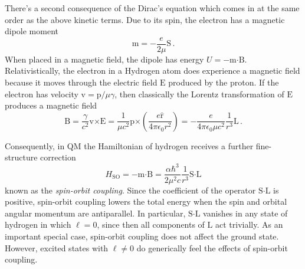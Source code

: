\documentclass{article}
\theoremstyle{plain}\theoremheaderfont{\normalfont\itshape}\theorembodyfont{\rmfamily}\theoremseparator{.}\newtheorem*{rem}{Remark}\newtheorem*{ex}{Example}\newtheorem*{proof}{Proof}\newtheorem*{altp}{Alternative proof}
\theoremstyle{plain}\theoremheaderfont{\normalfont\bfseries}\theorembodyfont{\rmfamily}\theoremseparator{.}\newtheorem{thm}{Theorem}[section]\newtheorem{lem}[thm]{Lemma}\newtheorem{prop}[thm]{Proposition}\newtheorem*{cor}{Corollary}\newtheorem{defn}[thm]{Definition}\newtheorem{clm}[thm]{Claim}\newtheorem{clminproof}{Claim}
\theoremstyle{break}\theoremheaderfont{\normalfont\itshape}\theorembodyfont{\rmfamily}\theoremseparator{.\medskip}\newtheorem*{proofskip}{Proof}\newtheorem*{exs}{Examples}\newtheorem*{rems}{Remarks}
\theoremstyle{break}\theoremheaderfont{\normalfont\bfseries}\theorembodyfont{\rmfamily}\theoremseparator{.\medskip}\newtheorem{lemskip}[thm]{Lemma}\newtheorem{defnskip}[thm]{Definition}\newtheorem{propskip}[thm]{Proposition}\newtheorem{thmskip}[thm]{Theorem}
\numberwithin{equation}{section}
\newcommand{\vb}[1]{\bm{\mathrm{#1}}}
\newcommand{\vu}[1]{\hat{\bm{\mathrm{#1}}}}
\newcommand{\cross}{\bm{\times}}
\newcommand{\vdot}{\bm{\cdot}}
\begin{document}
    There's a second consequence of the Dirac's equation which comes in at the same order as the above kinetic terms. Due to its spin, the electron has a magnetic dipole moment
    \begin{equation}
        \vb{m}=-\frac{e}{2\mu}\vb{S}\,.
    \end{equation}
    When placed in a magnetic field, the dipole has energy \(U=-\vb{m}\vdot\vb{B}\). Relativistically, the electron in a Hydrogen atom does experience a magnetic field because it moves through the electric field \(\vb{E}\) produced by the proton. If the electron has velocity \(\vb{v}=\vb{p}/\mu\gamma\), then classically the Lorentz transformation of \(\vb{E}\) produces a magnetic field
    \begin{equation}
        \vb{B}=\frac{\gamma}{c^2}\vb{v}\cross\vb{E}=\frac{1}{\mu c^2}\vb{p}\cross\left(\frac{e\vu{r}}{4\pi\epsilon_0 r^2}\right)=-\frac{e}{4\pi\epsilon_0\mu c^2}\frac{1}{r^3}\vb{L}\,.
    \end{equation}

    Consequently, in QM the Hamiltonian of hydrogen receives a further fine-structure correction
    \begin{equation}
        H_{\text{SO}}=-\vb{m}\vdot\vb{B}=\frac{\alpha\hbar^3}{2\mu^2 c}\frac{1}{r^3}\vb{S}\vdot\vb{L}
    \end{equation}
    known as the \textit{spin-orbit coupling}. Since the coefficient of the operator \(\vb{S}\vdot\vb{L}\) is positive, spin-orbit coupling lowers the total energy when the spin and orbital angular momentum are antiparallel. In particular, \(\vb{S}\vdot\vb{L}\) vanishes in any state of hydrogen in which \(\ell=0\), since then all components of \(\vb{L}\) act trivially. As an important special case, spin-orbit coupling does not affect the ground state. However, excited states with \(\ell\ne 0\) do generically feel the effects of spin-orbit coupling.
\end{document}
